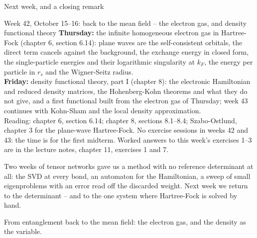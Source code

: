 \documentclass[aspectratio=169,10pt]{beamer}
\begin{document}
\begin{frame}[shrink=3]{Next week, and a closing remark}
  \begin{exampleblock}{Week 42, October 15--16: back to the mean field -- the electron gas, and density functional theory}
    \small
    \textbf{Thursday:} the infinite homogeneous electron gas in Hartree-Fock (chapter 6, section 6.14): plane waves are the self-consistent orbitals, the direct term cancels against the background, the exchange energy in closed form, the single-particle energies and their logarithmic singularity at $k_F$, the energy per particle in $r_s$ and the Wigner-Seitz radius.\\
    \textbf{Friday:} density functional theory, part I (chapter 8): the electronic Hamiltonian and reduced density matrices, the Hohenberg-Kohn theorems and what they do not give, and a first functional built from the electron gas of Thursday; week 43 continues with Kohn-Sham and the local density approximation.\\
    Reading: chapter 6, section 6.14; chapter 8, sections 8.1--8.4; Szabo-Ostlund, chapter 3 for the plane-wave Hartree-Fock. \alert{No exercise sessions in weeks 42 and 43: the time is for the first midterm.} Worked answers to this week's exercises 1--3 are in the lecture notes, chapter 11, exercises 1 and 7.
  \end{exampleblock}
  \vspace{0.5em}
  \small
  Two weeks of tensor networks gave us a method with no reference determinant at all: the SVD at every bond, an automaton for the Hamiltonian, a sweep of small eigenproblems with an error read off the discarded weight. Next week we return to the determinant -- and to the one system where Hartree-Fock is solved by hand.
  \vspace{0.4em}

  \centering\alert{From entanglement back to the mean field: the electron gas, and the density as the variable.}
\end{frame}
\end{document}
